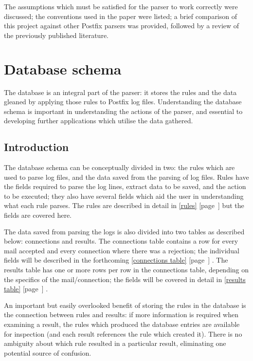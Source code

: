 \documentclass[a4paper,12pt,draft]{article}
\newcommand{\refwithpage}[1]{%
    \empty{}\ref{#1} [page~\pageref{#1}]%
}
\newcommand{\sectionref}[1]{%
    \textsection{}\refwithpage{#1}%
}
\begin{document}
The assumptions which must be satisfied for the parser to work correctly
were discussed; the conventions used in the paper were listed; a brief
comparison of this project against other Postfix parsers was provided,
followed by a review of the previously published literature.

\section{Database schema}
\label{database schema}

The database is an integral part of the parser: it stores the rules and the
data gleaned by applying those rules to Postfix log files.  Understanding
the database schema is important in understanding the actions of the
parser, and essential to developing further applications which utilise the
data gathered.

\subsection{Introduction}

The database schema can be conceptually divided in two: the rules which are
used to parse log files, and the data saved from the parsing of log files.
Rules have the fields required to parse the log lines, extract data to be
saved, and the action to be executed; they also have several fields which
aid the user in understanding what each rule parses.  The rules are
described in detail in \sectionref{rules} but the fields are covered here.

The data saved from parsing the logs is also divided into two tables as
described below: connections and results.  The connections table contains a
row for every mail accepted and every connection where there was a
rejection; the individual fields will be described in the forthcoming
\sectionref{connections table}.  The results table has one or more rows per
row in the connections table, depending on the specifics of the
mail/connection; the fields will be covered in detail in
\sectionref{results table}.

An important but easily overlooked benefit of storing the rules in the
database is the connection between rules and results: if more information
is required when examining a result, the rules which produced the database
entries are available for inspection (and each result references the rule
which created it).  There is no ambiguity about which rule resulted in a
particular result, eliminating one potential source of confusion.
\end{document}
